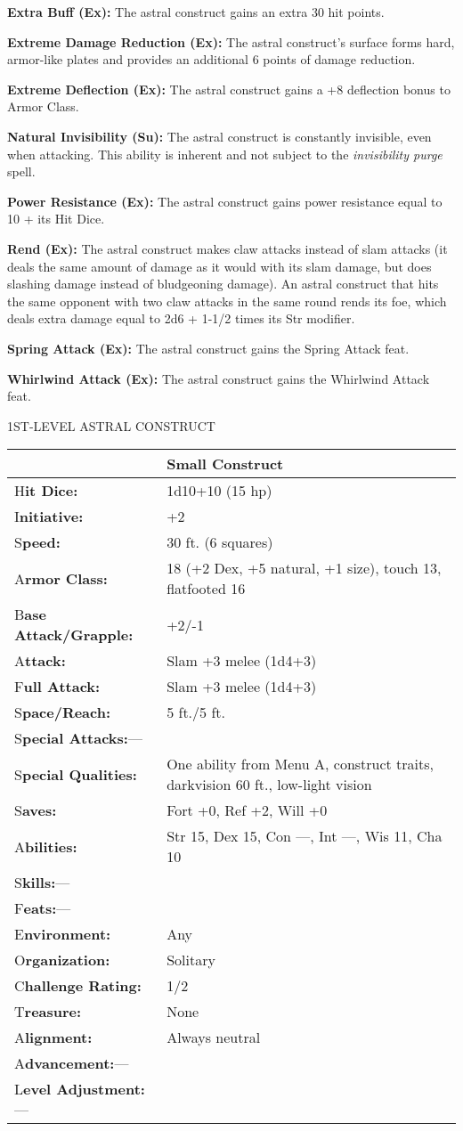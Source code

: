 \documentclass{article}
\begin{document}
\textbf{Extra Buff (Ex):} The astral construct gains an extra 30 hit points.

\textbf{Extreme Damage Reduction (Ex):} The astral construct's surface forms hard, 
armor-like plates and provides an additional 6 points of damage reduction.

\textbf{Extreme Deflection (Ex):} The astral construct gains a +8 deflection bonus 
to Armor Class.

\textbf{Natural Invisibility (Su):} The astral construct is constantly invisible, 
even when attacking. This ability is inherent and not subject to the \textit{invisibility 
purge }spell.

\textbf{Power Resistance (Ex):} The astral construct gains power resistance equal 
to 10 + its Hit Dice.

\textbf{Rend (Ex):} The astral construct makes claw attacks instead of slam attacks 
(it deals the same amount of damage as it would with its slam damage, but does 
slashing damage instead of bludgeoning damage). An astral construct that hits the 
same opponent with two claw attacks in the same round rends its foe, which deals 
extra damage equal to 2d6 + 1-1/2 times its Str modifier.

\textbf{Spring Attack (Ex):} The astral construct gains the Spring Attack feat.

\textbf{Whirlwind Attack (Ex):} The astral construct gains the Whirlwind Attack 
feat.

\vspace{12pt}
{\LARGE{}1ST-LEVEL ASTRAL CONSTRUCT}

\begin{tabular}{|>{\raggedright}p{76pt}|>{\raggedright}p{250pt}|}
\hline
  & Small Construct\tabularnewline
\hline
H\textbf{it Dice:} & 1d10+10 (15 hp)\tabularnewline
\hline
I\textbf{nitiative:} & +2\tabularnewline
\hline
S\textbf{peed:} & 30 ft. (6 squares)\tabularnewline
\hline
A\textbf{rmor Class:} & 18 (+2 Dex, +5 natural, +1 size), touch 13, flatfooted 
16\tabularnewline
\hline
B\textbf{ase Attack/Grapple:} & +2/-1\tabularnewline
\hline
A\textbf{ttack:} & Slam +3 melee (1d4+3)\tabularnewline
\hline
F\textbf{ull Attack:} & Slam +3 melee (1d4+3)\tabularnewline
\hline
S\textbf{pace/Reach:} & 5 ft./5 ft.\tabularnewline
\hline
S\textbf{pecial Attacks:}--- & \tabularnewline
\hline
S\textbf{pecial Qualities:} & One ability from Menu A, construct traits, darkvision 
60 ft., low-light vision\tabularnewline
\hline
S\textbf{aves:} & Fort +0, Ref +2, Will +0\tabularnewline
\hline
A\textbf{bilities:} & Str 15, Dex 15, Con ---, Int ---, Wis 11, Cha 10\tabularnewline
\hline
S\textbf{kills:}--- & \tabularnewline
\hline
F\textbf{eats:}--- & \tabularnewline
\hline
E\textbf{nvironment:} & Any\tabularnewline
\hline
O\textbf{rganization:} & Solitary\tabularnewline
\hline
C\textbf{hallenge Rating:} & 1/2\tabularnewline
\hline
T\textbf{reasure:} & None\tabularnewline
\hline
A\textbf{lignment:} & Always neutral\tabularnewline
\hline
A\textbf{dvancement:}--- & \tabularnewline
\hline
L\textbf{evel Adjustment:}--- & \tabularnewline
\hline
\end{tabular}
\end{document}
